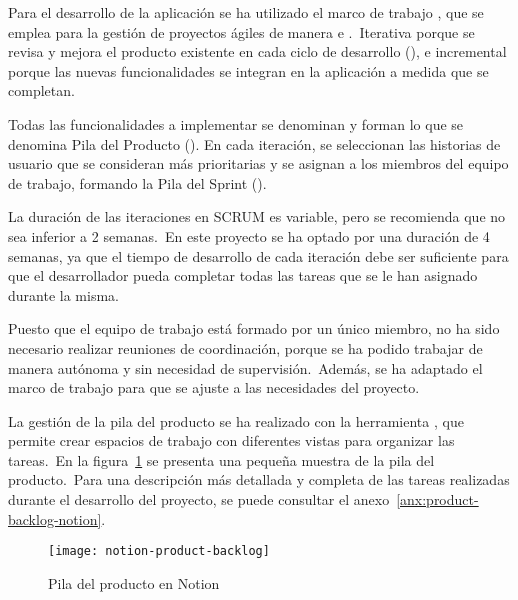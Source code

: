 
Para el desarrollo de la aplicación se ha utilizado el marco de trabajo , que se emplea para la gestión
de proyectos ágiles de manera  e .\ Iterativa porque se revisa y mejora
el producto existente en cada ciclo de desarrollo (), e incremental porque las nuevas
funcionalidades se integran en la aplicación a medida que se completan.

Todas las funcionalidades a implementar se
denominan  y forman lo que se denomina Pila del Producto ().
En cada iteración, se seleccionan las historias de usuario que se consideran más prioritarias y se asignan a los
miembros del equipo de trabajo, formando la Pila del Sprint ().

La duración de las iteraciones en SCRUM es variable, pero se recomienda que no sea inferior a 2 semanas.\ En este
proyecto se ha optado por una duración de 4 semanas, ya que el tiempo de desarrollo de cada iteración debe ser
suficiente para que el desarrollador pueda completar todas las tareas que se le han asignado durante la misma.

Puesto que el equipo de trabajo está formado por un único miembro, no ha sido necesario realizar reuniones de
coordinación, porque se ha podido trabajar de manera autónoma y sin necesidad de supervisión.\ Además, se ha
adaptado el marco de trabajo para que se ajuste a las necesidades del proyecto.

La gestión de la pila del producto se ha realizado con la herramienta , que permite crear espacios
de trabajo con diferentes vistas para organizar las tareas.\ En la figura~\ref{fig:notion-product-backlog} se presenta
una pequeña muestra de la pila del producto.\ Para una descripción más detallada y completa de las tareas realizadas
durante el desarrollo del proyecto, se puede consultar el anexo~\ref{anx:product-backlog-notion}.

\begin{figure}[H]
	\centering
	\texttt{[image: notion-product-backlog]}
	\caption{Pila del producto en Notion}
	\label{fig:notion-product-backlog}
\end{figure}
